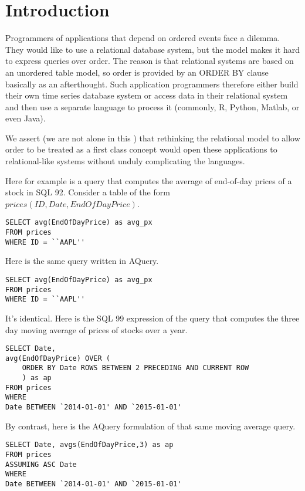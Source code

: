 \documentclass{acm_proc_article-sp}
\begin{document}
\section{Introduction}

Programmers of applications that depend on ordered events 
face a dilemma. They would like to use a relational database system, but the
model makes it hard to express queries over order.
The reason is that relational systems are based on an unordered table model,
so order is provided by an ORDER BY clause basically as an afterthought.
Such application programmers therefore either build their own
time series database system or access data in their relational system
and then use a separate language to process it (commonly, 
R, Python, Matlab, or even Java).

We assert (we are not alone in this
\cite{seshadri1996seq}\cite{ng2001extension}\cite{kersten2011sciql})
that rethinking the relational model to allow order to be 
treated as a first class concept would open these applications to
relational-like systems without unduly complicating the languages.

Here for example is a query that computes the average of end-of-day prices of
a stock in SQL 92. Consider a table of the form $prices(ID, Date, EndOfDayPrice)$.

\begin{lstlisting}
SELECT avg(EndOfDayPrice) as avg_px 
FROM prices 
WHERE ID = ``AAPL''
\end{lstlisting}

Here is the same query written in AQuery.
\begin{lstlisting}
SELECT avg(EndOfDayPrice) as avg_px 
FROM prices 
WHERE ID = ``AAPL''
\end{lstlisting}

It's identical. 
Here is the SQL 99 expression of 
the query that computes the three
day moving average
of prices of stocks over a year.

\begin{lstlisting}
SELECT Date, 
avg(EndOfDayPrice) OVER ( 
 	ORDER BY Date ROWS BETWEEN 2 PRECEDING AND CURRENT ROW
 	) as ap 
FROM prices 
WHERE 
Date BETWEEN `2014-01-01' AND `2015-01-01'
\end{lstlisting}

By contrast, here is the AQuery formulation
of that same moving average query.

\begin{lstlisting}
SELECT Date, avgs(EndOfDayPrice,3) as ap 
FROM prices 
ASSUMING ASC Date 
WHERE 
Date BETWEEN `2014-01-01' AND `2015-01-01'
\end{lstlisting}
\end{document}
